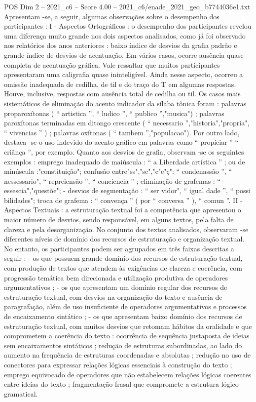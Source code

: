 \begin{textsample}{POS Dim 2 – 2021\_c6 – Score 4.00 – 2021\_c6/enade\_2021\_geo\_b7744036e1.txt}
Apresentam -se, a seguir, algumas observações sobre o desempenho dos participantes : I - Aspectos Ortográficos : o desempenho dos participantes revelou uma diferença muito grande nos dois aspectos analisados, como já foi observado nos relatórios dos anos anteriores : baixo índice de desvios da grafia padrão e grande índice de desvios de acentuação.
Em vários casos, ocorre ausência quase completa de acentuação gráfica.
Vale ressaltar que muitos participantes apresentaram uma caligrafia quase ininteligível.
Ainda nesse aspecto, ocorreu a omissão inadequada de cedilha, de til e do traço do T em algumas respostas.
Houve, inclusive, respostas com ausência total de cedilha ou til.
Os casos mais sistemáticos de eliminação do acento indicador da sílaba tônica foram : palavras proparoxítonas ( “ artistica ”, “ ludico ”, “ publico ”,"musica") ; palavras paroxítonas terminadas em ditongo crescente ( “ necessario ”,"historia","propria", “ vivencias ” ) ; palavras oxítonas ( “ tambem ”,"populacao").
Por outro lado, destaca -se o uso indevido do acento gráfico em palavras como “ propíciar ” “ criânça ”, por exemplo.
Quanto aos desvios de grafia, observam -se os seguintes exemplos : emprego inadequado de maiúscula : “ a Liberdade artística ” ; ou de minúscula :"constituição"; confusão entre"ss","sc","c"e"ç": “ condenassão ”, “ nessessario", “ repreiensão ”, “ conciencia ” ; eliminação de grafemas : “ essescia","questõe"; - desvios de segmentação : “ ser vidor", “ igual dade ”, “ possi bilidades"; troca de grafema : “ convença ” ( por “ conversa ” ), “ comun ”.
II - Aspectos Textuais : a estruturação textual foi a competência que apresentou o maior número de desvios, sendo responsável, em alguns textos, pela falta de clareza e pela desorganização.
No conjunto dos textos analisados, observaram -se diferentes níveis de domínio dos recursos de estruturação e organização textual.
No entanto, os participantes podem ser agrupados em três faixas descritas a seguir : - os que possuem grande domínio dos recursos de estruturação textual, com produção de textos que atendem às exigências de clareza e coerência, com progressão temática bem direcionada e utilização produtiva de operadores argumentativos ; - os que apresentam um domínio regular dos recursos de estruturação textual, com desvios na organização do texto e ausência de paragrafação, além de uso insuficiente de operadores argumentativos e processos de encaixamento sintático ; - os que apresentam baixo domínio dos recursos de estruturação textual, com muitos desvios que retomam hábitos da oralidade e que comprometem a coerência do texto : ocorrência de sequência justaposta de ideias sem encaixamentos sintáticos ; redução de estruturas subordinadas, ao lado do aumento na frequência de estruturas coordenadas e absolutas ; redução no uso de conectores para expressar relações lógicas essenciais à construção do texto ; emprego equivocado de operadores que não estabelecem relações lógicas coerentes entre ideias do texto ; fragmentação frasal que compromete a estrutura lógico-gramatical.

\end{textsample}
